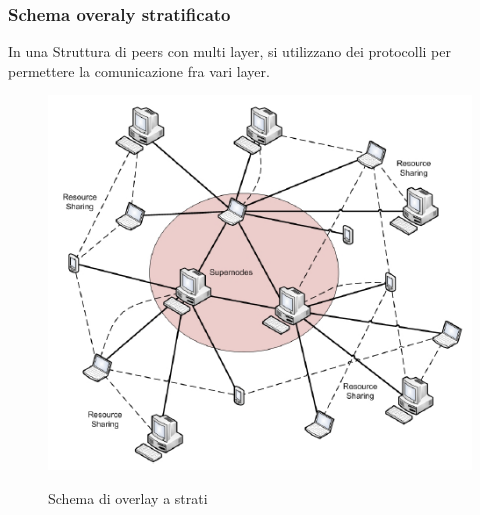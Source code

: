 \subsubsection{Schema overaly stratificato}
In una Struttura di peers con multi layer, si utilizzano dei protocolli per permettere la comunicazione fra vari layer.

\begin{figure}[h!]
    \centering
    \includegraphics[width=0.5\linewidth]{imgs/11 - layer overlay scheme.png}
    \label{fig:overlay}
    \caption{Schema di overlay a strati}
\end{figure}

